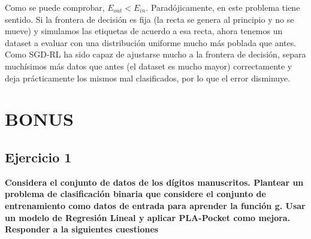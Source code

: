 \begin{itemize}
	Como se puede comprobar, $E_{out} < E_{in}$. Paradójicamente, en este problema tiene sentido. Si la frontera de decisión es fija (la recta se genera al principio y no se mueve) y simulamos las etiquetas de acuerdo a esa recta, ahora tenemos un dataset a evaluar con una distribución uniforme mucho más poblada que antes. Como SGD-RL ha sido capaz de ajustarse mucho a la frontera de decisión, separa muchísimos más datos  que antes (el dataset es mucho mayor) correctamente y deja prácticamente los mismos mal clasificados, por lo que el error disminuye.
\end{itemize}	
	
\section{BONUS}

\subsection{Ejercicio 1}

\textbf{Considera el conjunto de datos de los dígitos manuscritos. Plantear un problema de clasificación binaria que considere el conjunto de entrenamiento como datos de entrada para aprender la función g. Usar un modelo de Regresión Lineal y aplicar PLA-Pocket como mejora. Responder a la siguientes cuestiones}

